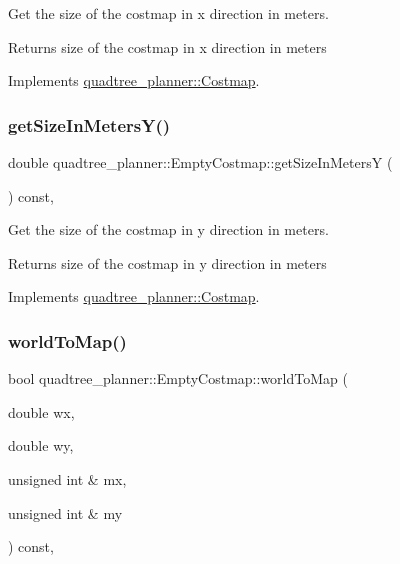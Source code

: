 Get the size of the costmap in x direction in meters. 

\begin{DoxyReturn}{Returns}
size of the costmap in x direction in meters 
\end{DoxyReturn}


Implements \hyperlink{classquadtree__planner_1_1Costmap_a86720bf9d3de86f59af0229d706763c1}{quadtree\+\_\+planner\+::\+Costmap}.

\mbox{\label{classquadtree__planner_1_1EmptyCostmap_aec6c2b1a739b6475f21219d688bc0b54}} 
\subsubsection{\texorpdfstring{get\+Size\+In\+Meters\+Y()}{getSizeInMetersY()}}
{\footnotesize\ttfamily double quadtree\+\_\+planner\+::\+Empty\+Costmap\+::get\+Size\+In\+MetersY (\begin{DoxyParamCaption}{ }\end{DoxyParamCaption}) const\hspace{0.3cm}{\ttfamily [override]}, {\ttfamily [virtual]}}



Get the size of the costmap in y direction in meters. 

\begin{DoxyReturn}{Returns}
size of the costmap in y direction in meters 
\end{DoxyReturn}


Implements \hyperlink{classquadtree__planner_1_1Costmap_ac0767c6851d243d8d12a8a0dbd2d022b}{quadtree\+\_\+planner\+::\+Costmap}.

\mbox{\label{classquadtree__planner_1_1EmptyCostmap_a329690825d4e3789189dc0b99c891786}} 
\subsubsection{\texorpdfstring{world\+To\+Map()}{worldToMap()}}
{\footnotesize\ttfamily bool quadtree\+\_\+planner\+::\+Empty\+Costmap\+::world\+To\+Map (\begin{DoxyParamCaption}\item[{double}]{wx,  }\item[{double}]{wy,  }\item[{unsigned int \&}]{mx,  }\item[{unsigned int \&}]{my }\end{DoxyParamCaption}) const\hspace{0.3cm}{\ttfamily [override]}, {\ttfamily [virtual]}}




